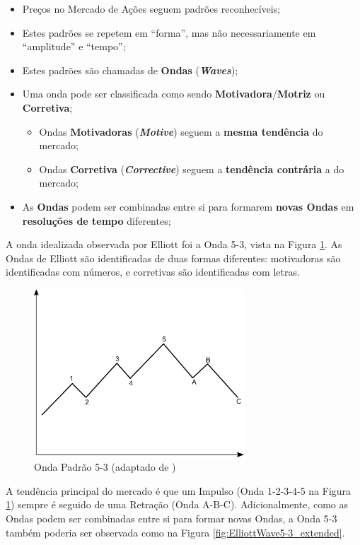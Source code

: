 \documentclass[12pt]{article}
\begin{document}
\begin{itemize}
	\item Preços no Mercado de Ações seguem padrões reconhecíveis;
	\item Estes padrões se repetem em ``forma'', mas não necessariamente em
		  ``amplitude'' e ``tempo'';
	\item Estes padrões são chamadas de \textbf{Ondas} (\textbf{\emph{Waves}});
	\item Uma onda pode ser classificada como sendo \textbf{Motivadora}/\textbf{Motriz}
		  ou \textbf{Corretiva};
	\begin{itemize}
		\item Ondas \textbf{Motivadoras} (\textbf{\emph{Motive}}) seguem a
			  \textbf{mesma tendência} do mercado;
		\item Ondas \textbf{Corretiva} (\textbf{\emph{Corrective}}) seguem a
			  \textbf{tendência contrária} a do mercado;
	\end{itemize}
	\item As \textbf{Ondas} podem ser combinadas entre si para formarem \textbf{novas Ondas}
		  em \textbf{resoluções de tempo} diferentes;
\end{itemize}

A onda idealizada observada por Elliott foi a Onda 5-3, vista na Figura \ref{fig:ElliottWave5-3}.
As Ondas de Elliott são identificadas de duas formas diferentes: motivadoras são identificadas
com números, e corretivas são identificadas com letras.

\begin{figure}[H]
	\centering
	\includegraphics[width=0.7\textwidth]{ElliottWave5-3.png}
	\caption{Onda Padrão 5-3 (adaptado de \cite{Masur})}\label{fig:ElliottWave5-3}
\end{figure}

A tendência principal do mercado é que um Impulso (Onda 1-2-3-4-5 na
Figura \ref{fig:ElliottWave5-3}) sempre é seguido de uma Retração (Onda A-B-C).
Adicionalmente, como as Ondas podem ser combinadas entre si para formar novas Ondas, a
Onda 5-3 também poderia ser observada como na Figura \ref{fig:ElliottWave5-3_extended}.
\end{document}
